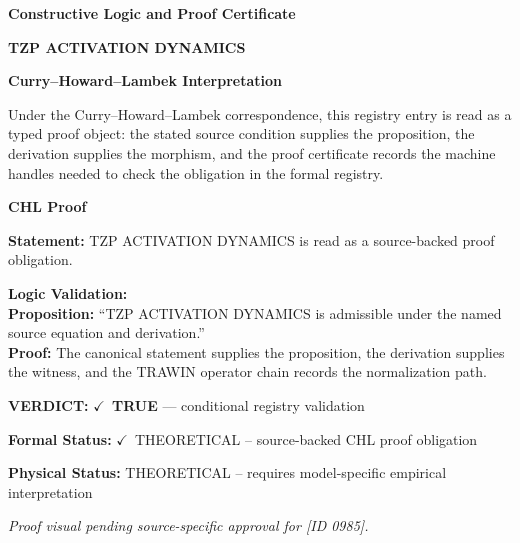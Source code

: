 \clearpage
\begingroup\tzpsupportsetup
\noindent\textbf{\fontsize{10.8pt}{12.8pt}\selectfont [ID 0985] Constructive Logic and Proof Certificate}\par
\noindent\textbf{\fontsize{10pt}{12pt}\selectfont TZP ACTIVATION DYNAMICS}\par
\vspace{0.45em}
\begingroup
\footnotesize
\setlength{\parskip}{0.22em}
\setlength{\parindent}{0pt}
\noindent\textbf{Curry--Howard--Lambek Interpretation}\par
Under the Curry--Howard--Lambek correspondence, this registry entry is read as a typed proof
object: the stated source condition supplies the proposition, the derivation supplies the
morphism, and the proof certificate records the machine handles needed to check the obligation
in the formal registry.

\vspace{0.45em}
\noindent\textbf{CHL Proof}\par
\textbf{Statement:} TZP ACTIVATION DYNAMICS is read as a source-backed proof obligation.

\textbf{Logic Validation:}\\
\textbf{Proposition:} ``TZP ACTIVATION DYNAMICS is admissible under the named source equation and derivation.''\\
\textbf{Proof:} The canonical statement supplies the proposition, the derivation supplies the witness, and the TRAWIN operator chain records the normalization path.

\textbf{VERDICT:} \ensuremath{\checkmark}\ \textbf{TRUE} --- conditional registry validation

\textbf{Formal Status:} \ensuremath{\checkmark}\ THEORETICAL -- source-backed CHL proof obligation

\textbf{Physical Status:} THEORETICAL -- requires model-specific empirical interpretation
\par\vspace{0.45em}
\par
\vfill
\begingroup\footnotesize\itshape
Proof visual pending source-specific approval for [ID 0985].
\par\endgroup
\vfill
\endgroup
\endgroup
